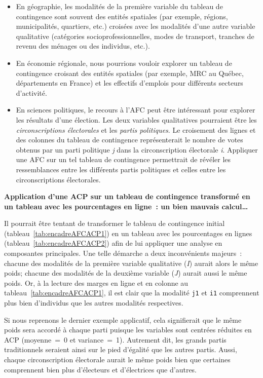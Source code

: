 \documentclass[
  11pt,
  french,
]{book}
\makeatletter
\providecommand{\tightlist}{%
  \setlength{\itemsep}{0pt}\setlength{\parskip}{0pt}}
\newenvironment{kframev}{%
\medskip{}
\setlength{\fboxsep}{.8em}
 \def\at@end@of@kframev{}%
 \ifinner\ifhmode%
  \def\at@end@of@kframev{\end{minipage}}%
  \begin{minipage}{\columnwidth}%
 \fi\fi%
 \def\FrameCommand##1{\hskip\@totalleftmargin \hskip-\fboxsep
 \colorbox{shadebluecolor}{##1}\hskip-\fboxsep
     \hskip-\linewidth \hskip-\@totalleftmargin \hskip\columnwidth}%
 \MakeFramed {\advance\hsize-\width
   \@totalleftmargin\z@ \linewidth\hsize
   \@setminipage}}%
 {\par\unskip\endMakeFramed%
 \at@end@of@kframev}
\newenvironment{rmdblock}[1]
  {
  \begin{itemize}
  \renewcommand{\labelitemi}{
    \raisebox{-.7\height}[0pt][0pt]{
      {\setkeys{Gin}{width=3em,keepaspectratio}\texttt{[image: images/\#1]}}
    }
  }
  \setlength{\fboxsep}{1em}
  \begin{kframev}
  \small
  \item
  }
  {
  \end{kframev}
  \end{itemize}
  }
\newenvironment{bloc_attention}
  {\begin{rmdblock}{attention}}
  {\end{rmdblock}}
\makeatother
\begin{document}
\begin{itemize}
\tightlist
\item
  En géographie, les modalités de la première variable du tableau de contingence sont souvent des entités spatiales (par exemple, régions, municipalités, quartiers, etc.) croisées avec les modalités d'une autre variable qualitative (catégories socioprofessionnelles, modes de transport, tranches de revenu des ménages ou des individus, etc.).
\item
  En économie régionale, nous pourrions vouloir explorer un tableau de contingence croisant des entités spatiales (par exemple, MRC au Québec, départements en France) et les effectifs d'emplois pour différents secteurs d'activité.
\item
  En sciences politiques, le recours à l'AFC peut être intéressant pour explorer les résultats d'une élection. Les deux variables qualitatives pourraient être les \emph{circonscriptions électorales} et les \emph{partis politiques}. Le croisement des lignes et des colonnes du tableau de contingence représenterait le nombre de votes obtenus par un parti politique \emph{j} dans la circonscription électorale \emph{i}. Appliquer une AFC sur un tel tableau de contingence permettrait de révéler les ressemblances entre les différents partis politiques et celles entre les circonscriptions électorales.
\end{itemize}

\begin{bloc_attention}
\textbf{Application d'une ACP sur un tableau de contingence transformé en un tableau avec les pourcentages en ligne~: un bien mauvais calcul\ldots{}}

Il pourrait être tentant de transformer le tableau de contingence initial (tableau~\ref{tab:encadreAFCACP1}) en un tableau avec les pourcentages en lignes (tableau~\ref{tab:encadreAFCACP2}) afin de lui appliquer une analyse en composantes principales. Une telle démarche a deux inconvénients majeurs~: chacune des modalités de la première variable qualitative (\emph{I}) aurait alors le même poids; chacune des modalités de la deuxième variable (\emph{J}) aurait aussi le même poids. Or, à la lecture des marges en ligne et en colonne au tableau~\ref{tab:encadreAFCACP1}, il est clair que la modalité \texttt{j1} et \texttt{i1} comprennent plus bien d'individus que les autres modalités respectives.

Si nous reprenons le dernier exemple applicatif, cela signifierait que le même poids sera accordé à chaque parti puisque les variables sont centrées réduites en ACP (moyenne~=~0 et variance~=~1). Autrement dit, les grands partis traditionnels seraient ainsi sur le pied d'égalité que les autres partis. Aussi, chaque circonscription électorale aurait le même poids bien que certaines comprennent bien plus d'électeurs et d'électrices que d'autres.

\end{bloc_attention}
\end{document}
